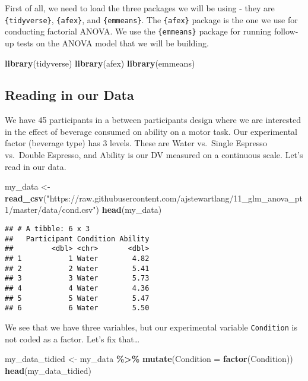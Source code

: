 \documentclass[
]{book}
\newenvironment{Shaded}{\begin{snugshade}}{\end{snugshade}}
\newcommand{\AttributeTok}[1]{\textcolor[rgb]{0.13,0.29,0.53}{#1}}
\newcommand{\FunctionTok}[1]{\textcolor[rgb]{0.13,0.29,0.53}{\textbf{#1}}}
\newcommand{\NormalTok}[1]{#1}
\newcommand{\OtherTok}[1]{\textcolor[rgb]{0.56,0.35,0.01}{#1}}
\newcommand{\SpecialCharTok}[1]{\textcolor[rgb]{0.81,0.36,0.00}{\textbf{#1}}}
\newcommand{\StringTok}[1]{\textcolor[rgb]{0.31,0.60,0.02}{#1}}
\begin{document}
First of all, we need to load the three packages we will be using - they are \texttt{\{tidyverse\}}, \texttt{\{afex\}}, and \texttt{\{emmeans\}}. The \texttt{\{afex\}} package is the one we use for conducting factorial ANOVA. We use the \texttt{\{emmeans\}} package for running follow-up tests on the ANOVA model that we will be building.

\begin{Shaded}
\begin{Highlighting}[]
\FunctionTok{library}\NormalTok{(tidyverse)}
\FunctionTok{library}\NormalTok{(afex)}
\FunctionTok{library}\NormalTok{(emmeans)}
\end{Highlighting}
\end{Shaded}

\hypertarget{reading-in-our-data}{%
\subsection{Reading in our Data}\label{reading-in-our-data}}

We have 45 participants in a between participants design where we are interested in the effect of beverage consumed on ability on a motor task. Our experimental factor (beverage type) has 3 levels. These are Water vs.~Single Espresso vs.~Double Espresso, and Ability is our DV measured on a continuous scale. Let's read in our data.

\begin{Shaded}
\begin{Highlighting}[]
\NormalTok{my\_data }\OtherTok{\textless{}{-}} \FunctionTok{read\_csv}\NormalTok{(}\StringTok{"https://raw.githubusercontent.com/ajstewartlang/11\_glm\_anova\_pt1/master/data/cond.csv"}\NormalTok{)}
\FunctionTok{head}\NormalTok{(my\_data)}
\end{Highlighting}
\end{Shaded}

\begin{verbatim}
## # A tibble: 6 x 3
##   Participant Condition Ability
##         <dbl> <chr>       <dbl>
## 1           1 Water        4.82
## 2           2 Water        5.41
## 3           3 Water        5.73
## 4           4 Water        4.36
## 5           5 Water        5.47
## 6           6 Water        5.50
\end{verbatim}

We see that we have three variables, but our experimental variable \texttt{Condition} is not coded as a factor. Let's fix that\ldots{}

\begin{Shaded}
\begin{Highlighting}[]
\NormalTok{my\_data\_tidied }\OtherTok{\textless{}{-}}\NormalTok{ my\_data }\SpecialCharTok{\%\textgreater{}\%}
  \FunctionTok{mutate}\NormalTok{(}\AttributeTok{Condition =} \FunctionTok{factor}\NormalTok{(Condition))}
\FunctionTok{head}\NormalTok{(my\_data\_tidied)}
\end{Highlighting}
\end{Shaded}
\end{document}
